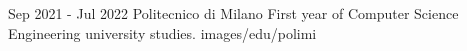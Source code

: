 {Sep 2021 - Jul 2022}
{Politecnico di Milano}
{First year of Computer Science Engineering university studies.}
{images/edu/polimi}
